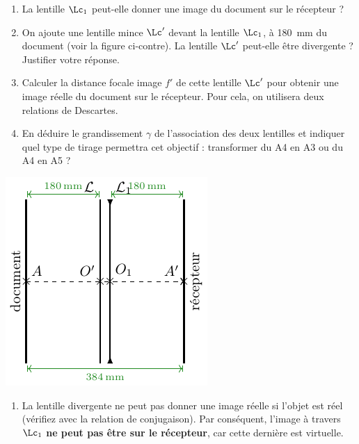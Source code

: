 \documentclass[../../main/main.tex]{subfiles}
\begin{document}
{	\begin{minipage}{0.55\linewidth}
		\begin{enumerate}
			\item La lentille $\Lc_1$ peut-elle donner une image du document sur le
			      récepteur ?
			\item On ajoute une lentille mince $\Lc'$ devant la lentille $\Lc_1$, à
			      \SI{180}{mm} du document (voir la figure ci-contre). La lentille
			      $\Lc'$ peut-elle être divergente ? Justifier votre réponse.
			\item Calculer la distance focale image $f'$ de cette lentille $\Lc'$
			      pour obtenir une image réelle du document sur le récepteur. Pour
			      cela, on utilisera deux relations de Descartes.
			\item En déduire le grandissement $\gamma$ de l'association des deux
			      lentilles et indiquer quel type de tirage permettra cet objectif :
			      transformer du A4 en A3 ou du A4 en A5 ?
		\end{enumerate}
	\end{minipage}
	\begin{minipage}{0.45\linewidth}
		\begin{center}
			\includegraphics[width=\linewidth]{photocopieur-b}
		\end{center}
	\end{minipage}
}{
	\begin{enumerate}
		\item La lentille divergente ne peut pas donner une image réelle si l'objet
		      est réel (vérifiez avec la relation de conjugaison). Par conséquent,
		      l'image à travers $\Lc_1$ \textbf{ne peut pas être sur le récepteur},
		      car cette dernière est virtuelle.


\end{enumerate}}
\end{document}
